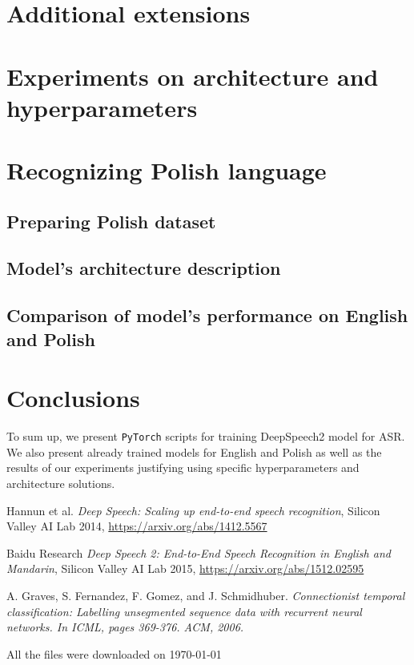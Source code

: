 \documentclass[licencjacka,en]{pracamgr}
\newcommand{\bibDownloadDate}{\today}
\begin{document}
\chapter{Additional extensions}\label{r:extens}


\chapter{Experiments on architecture and hyperparameters}\label{r:hypers}


\chapter{Recognizing Polish language}\label{r:polish}

\section{Preparing Polish dataset}
\section{Model’s architecture description}
\section{Comparison of model's performance on English and Polish}


\chapter{Conclusions}\label{r:concls}

To sum up, we present \texttt{PyTorch} scripts for training DeepSpeech2 model for ASR. We also present already trained models for English and Polish as well as the results of our experiments justifying using specific hyperparameters and architecture solutions.\\

\begin{thebibliography}{99}

 Hannun et al. 
\textit{Deep Speech: Scaling up end-to-end speech recognition}, Silicon Valley AI Lab 2014, \href{https://arxiv.org/abs/1412.5567}{https://arxiv.org/abs/1412.5567}
  
 Baidu Research \textit{ Deep Speech 2: End-to-End Speech Recognition in English and Mandarin}, Silicon Valley AI Lab 2015, \href{https://arxiv.org/abs/1512.02595}{https://arxiv.org/abs/1512.02595}

 A. Graves, S. Fernandez, F. Gomez, and J. Schmidhuber. \textit{ Connectionist temporal classification:
Labelling unsegmented sequence data with recurrent neural networks. In ICML, pages 369-376. ACM, 2006. }
 
\end{thebibliography}
All the files were downloaded on \bibDownloadDate
\end{document}
